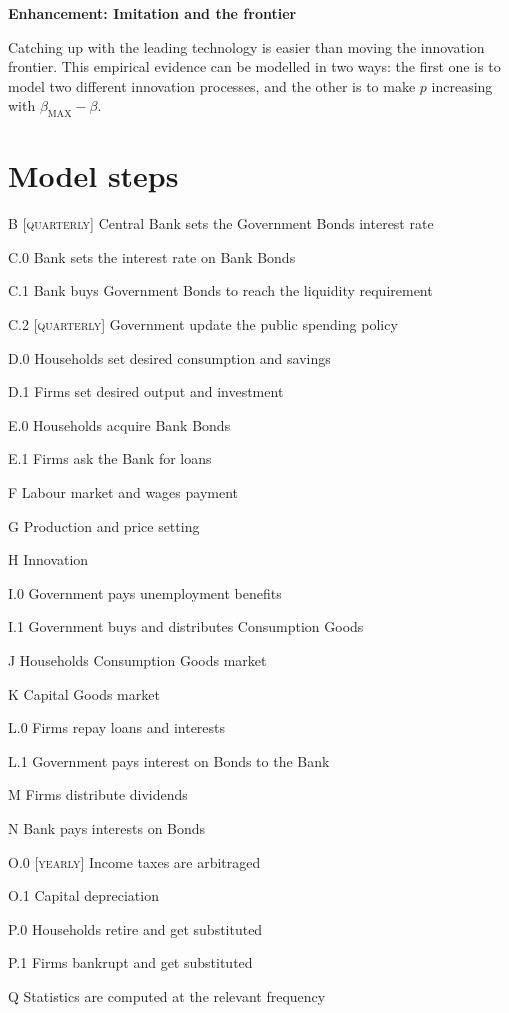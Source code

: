 \documentclass[a4paper, headings=standardclasses]{scrartcl}
\newenvironment{enh}[1][]{\begin{framed}\noindent\textbf{Enhancement: #1}\par}{\end{framed}}
\begin{document}
\begin{enh}[Imitation and the frontier]
	Catching up with the leading technology is easier than moving the innovation frontier. This empirical evidence can be modelled in two ways: the first one is to model two different innovation processes, and the other is to make $p$ increasing with $\beta_\text{MAX} - \beta$.
\end{enh}

\section{Model steps}
\begin{steps}
	\item[B] [\textsc{quarterly}] Central Bank sets the Government Bonds interest rate
	\item[C.0] Bank sets the interest rate on Bank Bonds
	\item[C.1] Bank buys Government Bonds to reach the liquidity requirement
	\item[C.2] [\textsc{quarterly}] Government update the public spending policy
	\item[D.0] Households set desired consumption and savings
	\item[D.1] Firms set desired output and investment
	\item[E.0] Households acquire Bank Bonds
	\item[E.1] Firms ask the Bank for loans
	\item[F] Labour market and wages payment
	\item[G] Production and price setting
	\item[H] Innovation
	\item[I.0] Government pays unemployment benefits
	\item[I.1] Government buys and distributes Consumption Goods
	\item[J] Households Consumption Goods market
	\item[K] Capital Goods market
	\item[L.0] Firms repay loans and interests
	\item[L.1] Government pays interest on Bonds to the Bank
	\item[M] Firms distribute dividends
	\item[N] Bank pays interests on Bonds
	\item[O.0] [\textsc{yearly}] Income taxes are arbitraged
	\item[O.1] Capital depreciation
	\item[P.0] Households retire and get substituted
	\item[P.1] Firms bankrupt and get substituted
	\item[Q] Statistics are computed at the relevant frequency
\end{steps}
\end{document}
